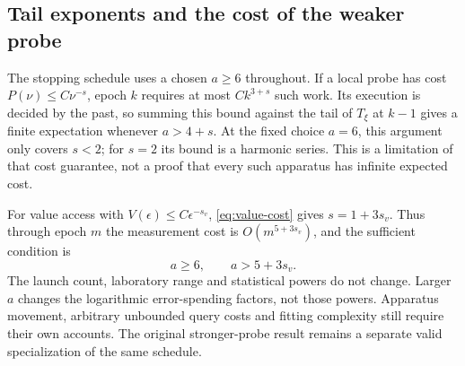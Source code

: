 \subsection{Tail exponents and the cost of the weaker probe}
The stopping schedule uses a chosen $a\ge6$ throughout. If a local
probe has cost $P(\nu)\le C\nu^{-s}$, epoch $k$ requires at most
$Ck^{3+s}$ such work. Its execution is decided by the past, so summing
this bound against the tail of $T_\xi$ at $k-1$ gives a finite expectation
whenever $a>4+s$. At the fixed choice $a=6$, this argument only covers
$s<2$; for $s=2$ its bound is a harmonic series. This is a limitation
of that cost guarantee, not a proof that every such apparatus has infinite
expected cost.

For value access with $V(\epsilon)\le C\epsilon^{-s_v}$,
\eqref{eq:value-cost} gives $s=1+3s_v$. Thus through epoch $m$ the
measurement cost is $O(m^{5+3s_v})$, and the sufficient condition is
\begin{equation}\label{eq:value-expectation}
                       a\ge6,\qquad a>5+3s_v.
\end{equation}
The launch count, laboratory range and statistical powers do not change.
Larger $a$ changes the logarithmic error-spending factors, not those
powers. Apparatus movement, arbitrary unbounded query costs and fitting
complexity still require their own accounts. The original stronger-probe
result remains a separate valid specialization of the same schedule.

